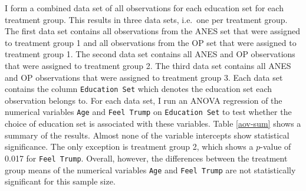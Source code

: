 \documentclass[12pt,econ]{sources/authesis}
\begin{document}
I form a combined data set of all observations for each education set for each treatment group. This results in three data sets, i.e.~one per treatment group. The first data set contains all observations from the ANES set that were assigned to treatment group 1 and all observations from the OP set that were assigned to treatment group 1. The second data set contains all ANES and OP observations that were assigned to treatment group 2. The third data set contains all ANES and OP observations that were assigned to treatment group 3. Each data set contains the column \texttt{Education\ Set} which denotes the education set each observation belongs to. For each data set, I run an ANOVA regression of the numerical variables \texttt{Age} and \texttt{Feel\ Trump} on \texttt{Education\ Set} to test whether the choice of education set is associated with these variables. Table \ref{aov-sum} shows a summary of the results. Almost none of the variable intercepts show statistical significance. The only exception is treatment group 2, which shows a \(p\)-value of 0.017 for \texttt{Feel\ Trump}. Overall, however, the differences between the treatment group means of the numerical variables \texttt{Age} and \texttt{Feel\ Trump} are not statistically significant for this sample size.
\end{document}
